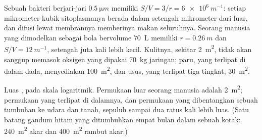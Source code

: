 \begin{example}\label{ex:b1:organism-environment:svnumbers}
Sebuah bakteri berjari-jari $\qty{0.5}{\micro m}$ memiliki
$S/V = 3/r = \qty{6e6}{m^{-1}}$: setiap mikrometer kubik sitoplasmanya
berada dalam setengah mikrometer dari luar, dan difusi lewat membrannya
memberinya makan seluruhnya. Seorang manusia yang dimodelkan sebagai
bola bervolume \qty{70}{L} memiliki $r = \qty{0.26}{m}$ dan
$S/V = \qty{12}{m^{-1}}$, setengah juta kali lebih kecil. Kulitnya,
sekitar \qty{2}{m^2}, tidak akan sanggup memasok oksigen yang dipakai
\qty{70}{kg} jaringan; paru, yang terlipat di dalam dada, menyediakan
\qty{100}{m^2}, dan usus, yang terlipat tiga tingkat,
\qty{30}{m^2}.
\end{example}

\begin{omfigure}

{\small Luas , pada skala logaritmik. Permukaan
luar seorang manusia adalah \qty{2}{m^2}; permukaan yang terlipat di
dalamnya, dan permukaan yang dibentangkan sebuah tumbuhan ke udara dan
tanah, sepuluh sampai dua ratus kali lebih luas. (Satu batang gandum
hitam yang ditumbuhkan empat bulan dalam sebuah kotak: \qty{240}{m^2}
akar dan \qty{400}{m^2} rambut akar.)}
\end{omfigure}

